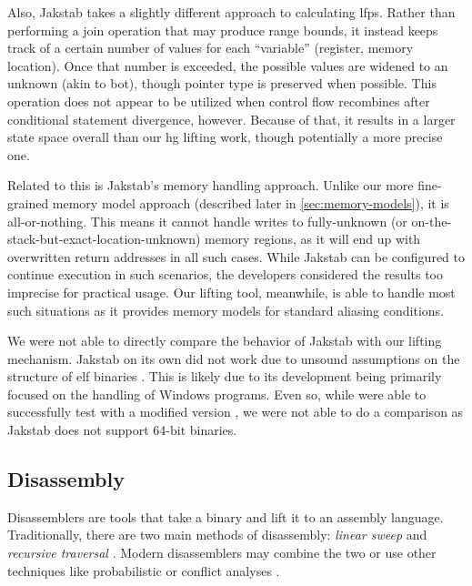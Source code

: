 Also, Jakstab takes a slightly different approach to calculating \glspl{lfp}.
Rather than performing a join operation that may produce range bounds,
it instead keeps track of a certain number of values for each ``variable'' (register, memory location).
Once that number is exceeded, the possible values are widened to an unknown (akin to \gls{bot}), though pointer type is preserved when possible.
This operation does not appear to be utilized when control flow recombines
after conditional statement divergence, however.
Because of that, it results in a larger state space overall than our \gls{hg} lifting work, though potentially a more precise one.

Related to this is Jakstab's memory handling approach.
Unlike our more fine-grained memory model approach (described later in \cref{sec:memory-models}), it is all-or-nothing.
This means it cannot handle writes to fully-unknown
(or on-the-stack-but-exact-location-unknown) memory regions,
as it will end up with overwritten return addresses in all such cases.
While Jakstab can be configured to continue execution in such scenarios,
the developers considered the results too imprecise for practical usage.
Our lifting tool, meanwhile, is able to handle most such situations
as it provides memory models for standard aliasing conditions.

\begin{remark}
  We were not able to directly compare the behavior of Jakstab with our lifting mechanism.
  Jakstab on its own did not work due to unsound assumptions on the structure of \gls{elf} binaries \autocite{jakstab-error}.
  This is likely due to its development being primarily focused on the handling of Windows programs.
  Even so, while were able to successfully test with a modified version \autocite{peterson2019,peterson2019artifact}, we were not able to do a comparison as Jakstab does not support 64-bit binaries.
\end{remark}

\subsection{Disassembly}\label{related-disassembly}
Disassemblers are tools that take a binary and lift it to an assembly language.
Traditionally, there are two main methods of disassembly: \emph{linear sweep}
and \emph{recursive traversal} \autocite{schwartz2002disassembly}.
Modern disassemblers may combine the two or use other techniques like probabilistic \autocite{wartell2011differentiating,wartell2014shingled,miller2019probabilistic} or conflict analyses \autocite{khadra2016speculative}.

